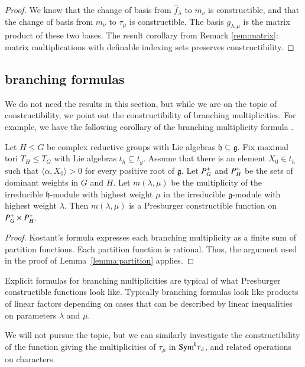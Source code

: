 \begin{proof}  We know that the change of basis from $\hat f_\lambda$ to $m_\nu$ is constructible,
and that the change of basis from $m_\nu$ to $\tau_\mu$ is constructible.  The basis $g_{\lambda,\mu}$
is the matrix product of these two bases.  The result corollary from Remark \ref{rem:matrix}:
matrix multiplications with definable indexing sets preserves constructibility.
\end{proof}

\subsection{branching formulas}

We do not need the results in this section, but while we are on the topic of constructibility,
we point out the constructibility of branching multiplicities.
For example, we have the following corollary of the branching
multiplicity formula \cite[Theorem ~8.2.1]{goodman}.

\begin{lemma} Let $H\le G$ be complex reductive groups with Lie algebras ${\mathfrak h}\subseteq {\mathfrak g}$.
Fix maximal tori $T_H\le T_G$ with Lie algebras $t_h\subseteq t_g$.  Assume that there is an element
$X_0\in t_h$ such that $\langle\alpha,X_0\rangle>0$ for every positive root of ${\mathfrak g}$.
Let $P^+_G$ and $P^+_H$ be the sets of dominant weights in $G$ and $H$.  Let $m(\lambda,\mu)$
be the multiplicity of the irreducible $\mathfrak h$-module with highest weight $\mu$ in the irreducible
$\mathfrak g$-module with highest weight $\lambda$.  Then $m(\lambda,\mu)$ is a Presburger constructible
function on $P^+_G\times P^+_H$.
\end{lemma}

\begin{proof}  Kostant's formula expresses each branching multiplicity as a finite sum of partition
functions.  Each partition function is rational.  
Thus, the argument used in the proof of Lemma~\ref{lemma:partition} applies.
\end{proof}

Explicit formulas for branching multiplicities are typical of what Presburger constructible functions look like.
Typically branching formulas look like products of linear factors depending on cases that can be
described by linear inequalities on parameters $\lambda$ and $\mu$.


We will not pursue the topic, but we can similarly investigate the constructibility of the function giving the
multiplicities of $\tau_\mu$ in ${\operatorname{Sym}}^k \tau_\lambda$, and related operations on characters.

